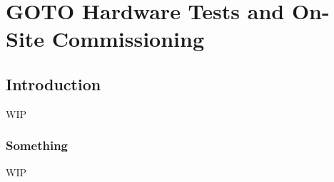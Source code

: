 \chapter{GOTO Hardware Tests and On-Site Commissioning}
\label{chap:commissioning}
\chaptoc{}


\newpage
\section{Introduction}
\label{sec:commissioning_intro}
\begin{colsection}


\begin{colsection}

WIP

\end{colsection}

\subsection{Something}
\label{sec:something}
\begin{colsection}

WIP

\end{colsection}


\end{colsection}


\newpage
